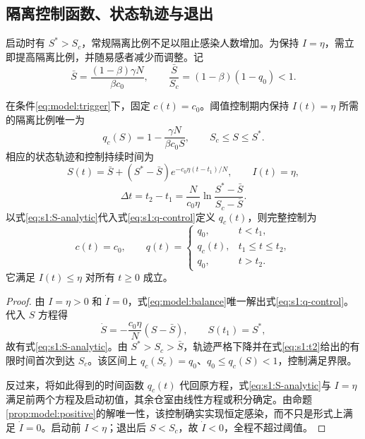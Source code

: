 \documentclass[lang=cn,a4paper,newtx]{elegantpaper}
\numberwithin{equation}{section}
\theoremstyle{plain}
\begin{document}
\subsection{隔离控制函数、状态轨迹与退出}
启动时有 $S^*>S_c$，常规隔离比例不足以阻止感染人数增加。为保持 $I=\eta$，需立即提高隔离比例，并随易感者减少而调整。记
\begin{equation}
\bar S=\frac{(1-\beta)\gamma N}{\beta c_0},\qquad
\frac{\bar S}{S_c}=(1-\beta)(1-q_0)<1.
\label{eq:s1:barS}
\end{equation}
\begin{theorem}
\label{thm:s1:qc-structure}\label{thm:s1:platform}
在条件\eqref{eq:model:trigger}下，固定 $c(t)=c_0$。阈值控制期内保持 $I(t)=\eta$ 所需的隔离比例唯一为
\begin{equation}
q_c(S)=1-\frac{\gamma N}{\beta c_0S},\qquad S_c\le S\le S^*.
\label{eq:s1:q-control}
\end{equation}
相应的状态轨迹和控制持续时间为
\begin{equation}
S(t)=\bar S+(S^*-\bar S)e^{-c_0\eta(t-t_1)/N},\qquad I(t)=\eta,
\label{eq:s1:S-analytic}
\end{equation}
\begin{equation}
\Delta t=t_2-t_1=\frac{N}{c_0\eta}\ln\frac{S^*-\bar S}{S_c-\bar S}.
\label{eq:s1:t2}
\end{equation}
以式\eqref{eq:s1:S-analytic}代入式\eqref{eq:s1:q-control}定义 $q_c(t)$，则完整控制为
\begin{equation}
c(t)=c_0,\qquad q(t)=\begin{cases}
q_0,&t<t_1,\\
q_c(t),&t_1\le t\le t_2,\\
q_0,&t>t_2.
\end{cases}
\label{eq:s1:q-piecewise}
\end{equation}
它满足 $I(t)\le\eta$ 对所有 $t\ge0$ 成立。
\end{theorem}
\begin{proof}
由 $I=\eta>0$ 和 $\dot I=0$，式\eqref{eq:model:balance}唯一解出式\eqref{eq:s1:q-control}。代入 $S$ 方程得
\[
\dot S=-\frac{c_0\eta}{N}(S-\bar S),\qquad S(t_1)=S^*,
\]
故有式\eqref{eq:s1:S-analytic}。由 $S^*>S_c>\bar S$，轨迹严格下降并在式\eqref{eq:s1:t2}给出的有限时间首次到达 $S_c$。该区间上 $q_c(S_c)=q_0$、$q_0\le q_c(S)<1$，控制满足界限。

反过来，将如此得到的时间函数 $q_c(t)$ 代回原方程，式\eqref{eq:s1:S-analytic}与 $I=\eta$ 满足前两个方程及启动初值，其余仓室由线性方程或积分确定。由命题\ref{prop:model:positive}的解唯一性，该控制确实实现恒定感染，而不只是形式上满足 $\dot I=0$。启动前 $I<\eta$；退出后 $S<S_c$，故 $\dot I<0$，全程不超过阈值。
\end{proof}
\end{document}
